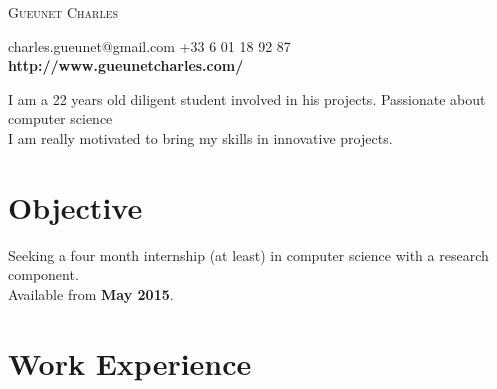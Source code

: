 \documentclass[a4paper, oneside, final]{scrartcl} %
\begin{document}
\begin{center} %


{\fontsize{36}{36}\selectfont\scshape 
Gueunet Charles} %

{\Large\Letter} charles.gueunet@gmail.com \hspace{0.2cm} {\Large\Telefon} +33 6 01 18 92 87 \\
\textbf{ http://www.gueunetcharles.com/} 


\vspace{0.3cm} %


\begin{flushleft}
  I am a 22 years old diligent student involved in his projects. Passionate about computer science \\
  I am really motivated to bring my skills in innovative projects.
\end{flushleft}


\section{Objective}

Seeking a four month internship (at least) in computer science with a research component.\\
Available from \textbf{May 2015}.


\section{Work Experience}


\end{center}
\end{document}
